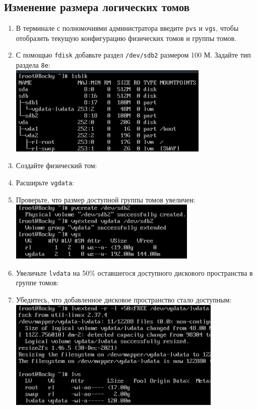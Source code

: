 \documentclass[12pt]{article}
\begin{document}
\subsection{Изменение размера логических томов}
\begin{enumerate}
	\item В терминале с полномочиями администратора введите \texttt{pvs} и \texttt{vgs}, чтобы отобразить
	      текущую конфигурацию физических томов и группы томов.
	\item С помощью \texttt{fdisk} добавьте раздел \texttt{/dev/sdb2} размером 100 М. Задайте тип раздела \texttt{8e}:
	      \\\includegraphics{10.png}
	\item Создайте физический том:
	\item Расширьте \texttt{vgdata}:
	\item Проверьте, что размер доступной группы томов увеличен:
	      \\\includegraphics{11.png}
	\item Увеличьте \texttt{lvdata} на 50\% оставшегося доступного дискового пространства в группе томов:
	\item Убедитесь, что добавленное дисковое пространство стало доступным:
	      \\\includegraphics{12.png}

\end{enumerate}
\end{document}
